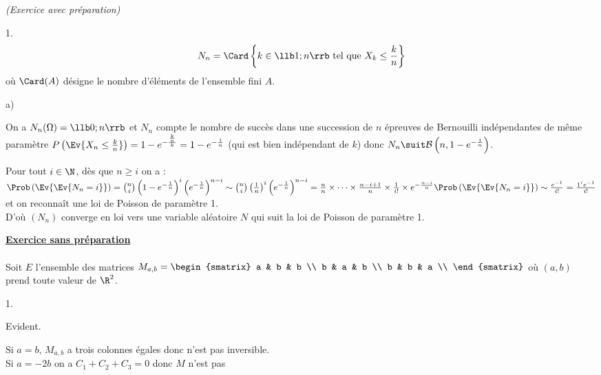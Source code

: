 \documentclass[11pt]{article}%
\begin{document}
\begin{exercice}{\it (Exercice avec préparation)}
\begin{noliste}{1.}
\[
 N_{n} = \Card \left\{ k \in \llb 1 ; n \rrb \text{ tel que } X_{k}
\leq \frac{k}{n} \right\}
\]
 où $\Card (A)$ désigne le nombre d'éléments de l'ensemble fini $A$.
 \begin{noliste}{a)}
 \setlength{\itemsep}{2mm} 
 \item On a $N_{n} (\Omega) = \llb 0 ; n \rrb$ et $N_{n}$ compte le
nombre de succès dans une succession de $n$ épreuves de Bernouilli
indépendantes de même paramètre $P \left(\Ev{ X_{n} \leq
\frac{k}{n}}\right) = 1 - e^{ - \frac{ \frac{k}{n} }{k} } = 1 - e^{ -
\frac{1}{n} }$ (qui est bien indépendant de $k$) donc $N_{n} \suit
\mathcal{B} \left( n, 1 - e^{ - \frac{1}{n} } \right)$. \\
 \item Pour tout $i \in \N$, dès que $n \geq i$ on a : \\
 $\Prob\left(\Ev{\Ev{ N_{n} = i}}\right) = \binom{n}{i} \left( 1 - e^{-
\frac{1}{n} } \right)^{i} \left( e^{ - \frac{1}{n} } \right)^{n-i} \sim
\binom{n}{i} \left( \frac{1}{n} \right)^{i} \left( e^{ - \frac{1}{n} }
\right)^{n-i} = \frac{n}{n} \times \dots \times \frac{n-i + 1}{n}
\times \frac{1}{i!} \times e^{- \frac{n-i}{n} } \\
\Prob\left(\Ev{\Ev{ N_{n} = i}}\right) \sim \frac{e^{ -1}}{i!} =
\frac{1^{i} e^{-1} }{i!}$ et on reconnaît une loi de Poisson de
paramètre 1. \\
 D'où $(N_{n})$ converge en loi vers une variable aléatoire $N$ qui
suit la loi de Poisson de paramètre 1. \\
 \end{noliste} 
 \end{noliste}
 \noindent \textbf{\underline{Exercice sans préparation}} \\
\\
 Soit $E$ l'ensemble des matrices $M_{a,b} = \begin{smatrix}
a & b & b \\
b & a & b \\
b & b & a \\
\end{smatrix}
$ où $(a,b)$ prend toute valeur de $\R^{2}$. \begin{noliste}{1.}
 \setlength{\itemsep}{4mm}
 \item Evident. \\
 \item Si $a = b$, $M_{a,b}$ a trois colonnes égales donc n'est pas
inversible. \\
 Si $a = -2b$ on a $C_{1} + C_{2} + C_{3} = 0$ donc $M$ n'est pas

\end{noliste}
\end{exercice}
\end{document}
